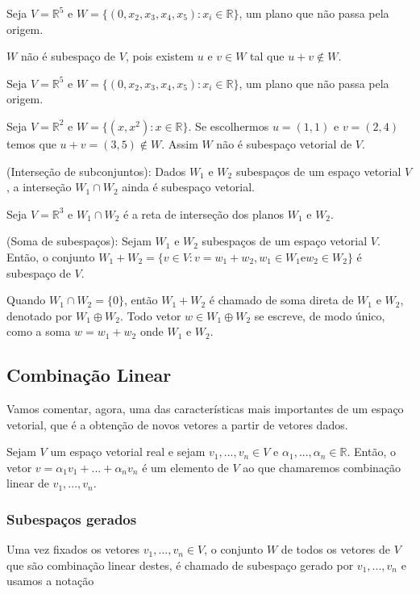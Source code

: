 \begin{ex}
	Seja $V= \mathbb{R}^{5}$ e $W=\{(0,x_{2},x_{3},x_{4},x_{5}): x_{i}\in \mathbb{R}\}$, um plano que não passa pela origem.
\end{ex}
$W$ não é subespaço de $V$, pois existem $u$ e $v\in W$ tal que $u+v\notin W$.
\begin{ex}
	Seja $V= \mathbb{R}^{5}$ e $W=\{(0,x_{2},x_{3},x_{4},x_{5}): x_{i}\in \mathbb{R}\}$, um plano que não passa pela origem.
\end{ex}
\begin{ex}
	Seja $V= \mathbb{R}^{2}$ e $W=\{(x,x^{2}): x\in \mathbb{R}\}$. Se escolhermos $u=(1,1)$ e $v=(2,4)$ temos que $u+v=(3,5) \notin W$. Assim $W$ não é subespaço vetorial de $V$.
\end{ex}
\begin{teo}
	(Interseção de subconjuntos): Dados $W_{1}$ e $W_{2}$ subespaços de um espaço vetorial $V$, a interseção $W_{1}\cap W_{2}$ ainda é subespaço vetorial.
\end{teo}
\begin{ex}
	Seja $V= \mathbb{R}^{3}$ e $W_{1}\cap W_{2}$ é a reta de interseção dos planos $W_{1}$ e $W_{2}$.
\end{ex}
\begin{teo}
	(Soma de subespaços): Sejam $W_{1}$ e $W_{2}$ subespaços de um espaço vetorial $V$. Então, o conjunto $W_{1}+W_{2}=\{v\in V: v=w_{1}+w_{2}, w_{1}\in W_{1} \text{e} w_{2}\in W_{2}\}$ é subespaço de $V$.
\end{teo}
Quando $W_{1}\cap W_{2}=\{0\}$, então $W_{1}+W_{2}$ é chamado de soma direta de $W_{1}$ e $W_{2}$, denotado por $W_{1}\oplus W_{2}$. Todo vetor $w\in W_{1}\oplus W_{2}$ se escreve, de modo único, como a soma $w=w_{1}+w_{2}$ onde $W_{1}$ e $W_{2}$.

\subsection{Combinação Linear} 

Vamos comentar, agora, uma das características mais importantes de um espaço vetorial, que é a obtenção de novos vetores a partir de vetores dados.
\begin{df}
Sejam $V$ um espaço vetorial real e sejam $v_{1},...,v_{n}\in V$ e $\alpha_{1},...,\alpha_{n}\in \mathbb{R}$. Então, o vetor $v=\alpha_{1}v_{1}+...+\alpha_{n}v_{n}$ é um elemento de $V$ ao que chamaremos combinação linear de $v_{1},...,v_{n}$.
\end{df}
\subsubsection{Subespaços gerados}
Uma vez fixados os vetores $v_{1},...,v_{n}\in V$, o conjunto $W$ de todos os vetores de $V$ que são combinação linear destes, é chamado de subespaço gerado por $v_{1},...,v_{n}$ e usamos a notação\\


